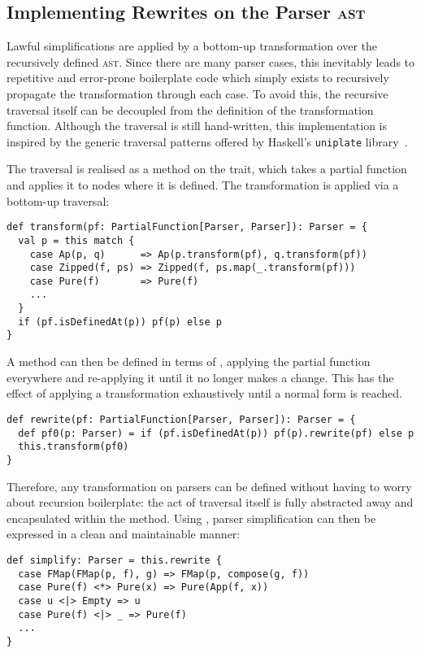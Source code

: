 \documentclass[../../../main.tex]{subfiles}
\begin{document}
\subsection{Implementing Rewrites on the Parser \textsc{ast}}
Lawful simplifications are applied by a bottom-up transformation over the recursively defined  \textsc{ast}.
Since there are many parser cases, this inevitably leads to repetitive and error-prone boilerplate code which simply exists to recursively propagate the transformation through each case.
To avoid this, the recursive traversal itself can be decoupled from the definition of the transformation function.
Although the traversal is still hand-written, this implementation is inspired by the generic traversal patterns offered by Haskell's \texttt{uniplate} library~\cite{mitchell_uniform_2007}.

The traversal is realised as a  method on the  trait, which takes a partial function and applies it to nodes where it is defined.
The transformation is applied via a bottom-up traversal:
\begin{verbatim}
def transform(pf: PartialFunction[Parser, Parser]): Parser = {
  val p = this match {
    case Ap(p, q)      => Ap(p.transform(pf), q.transform(pf))
    case Zipped(f, ps) => Zipped(f, ps.map(_.transform(pf)))
    case Pure(f)       => Pure(f)
    ...
  }
  if (pf.isDefinedAt(p)) pf(p) else p
}
\end{verbatim}
%
A  method can then be defined in terms of , applying the partial function everywhere and re-applying it until it no longer makes a change.
This has the effect of applying a transformation exhaustively until a normal form is reached.
\begin{verbatim}
def rewrite(pf: PartialFunction[Parser, Parser]): Parser = {
  def pf0(p: Parser) = if (pf.isDefinedAt(p)) pf(p).rewrite(pf) else p
  this.transform(pf0)
}
\end{verbatim}
%
Therefore, any transformation on parsers can be defined without having to worry about recursion boilerplate: the act of traversal itself is fully abstracted away and encapsulated within the  method.
Using , parser simplification can then be expressed in a clean and maintainable manner:
\begin{verbatim}
def simplify: Parser = this.rewrite {
  case FMap(FMap(p, f), g) => FMap(p, compose(g, f))
  case Pure(f) <*> Pure(x) => Pure(App(f, x))
  case u <|> Empty => u
  case Pure(f) <|> _ => Pure(f)
  ...
}
\end{verbatim}
%
\end{document}
